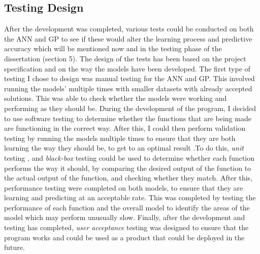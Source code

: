 \documentclass[11pt]{article}
\begin{document}
\subsection{Testing Design}\label{subsec:TD}
After the development was completed, various tests could be conducted on both the ANN and GP to see if these would alter the learning process and predictive accuracy which will be mentioned now and in the testing phase of the dissertation (section 5). The design of the tests has been based on the project specification and on the way the models have been developed. 
The first type of testing I chose to design was manual testing for the ANN and GP. This involved running the models' multiple times with smaller datasets with already accepted solutions. This was able to check whether the models were working and performing as they should be. 
During the development of the program, I decided to use software testing to determine whether the functions that are being made are functioning in the correct way. After this, I could then perform validation testing by running the models multiple times to ensure that they are both learning the way they should be, to get to an optimal result .To do this, \textit{unit} testing , and \textit{black-box} testing could be used to determine whether each function performs the way it should, by comparing the desired output of the function to the actual output of the function, and checking whether they match. After this, performance testing were completed on both models, to ensure that they are learning and predicting at an acceptable rate. This was completed by testing the performance of each function and the overall model to identify the areas of the model which may perform unusually slow. Finally, after the development and testing has completed, \textit{user acceptance} testing was designed to ensure that the program works and could be used as a product that could be deployed in the future. 
\end{document}
